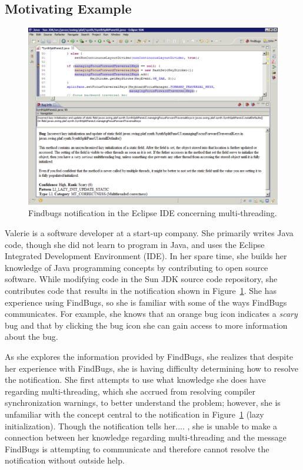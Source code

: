 \documentclass{llncs}
\begin{document}
\subsection*{Motivating Example}
\begin{figure} 
	\centering
	\includegraphics[width=\textwidth]{figs/eclipse.png}
	\caption{Findbugs notification in the Eclipse IDE concerning multi-threading.}
	\label{fig:eclipse}
\end{figure}

Valerie is a software developer at a start-up company. She primarily writes Java code, though she did not learn to program in Java, and uses the Eclipse Integrated Development Environment (IDE). In her spare time, she builds her knowledge of Java programming concepts by contributing to open source software. While modifying code in the Sun JDK source code repository, she contributes code that results in the notification shown in Figure~\ref{fig:eclipse}. She has experience using FindBugs, so she is familiar with some of the ways FindBugs communicates. For example, she knows that an orange bug icon indicates a \textit{scary} bug and that by clicking the bug icon she can gain access to more information about the bug.

As she explores the information provided by FindBugs, she realizes that despite her experience with FindBugs, she is having difficulty determining how to resolve the notification. She first attempts to use what knowledge she does have regarding multi-threading, which she accrued from resolving compiler synchronization warnings, to better understand the problem; however, she is unfamiliar with the concept central to the notification in Figure~\ref{fig:eclipse} (lazy initialization). Though the notification tells her.... , she is unable to make a connection between her knowledge regarding multi-threading and the message FindBugs is attempting to communicate and therefore cannot resolve the notification without outside help.
\end{document}
